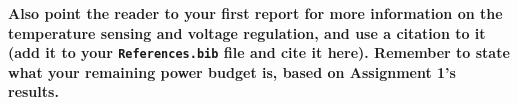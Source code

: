 \pagebreak


\textbf{Also point the reader to your first report for more information on the temperature sensing and voltage regulation, and use a citation to it (add it to your \texttt{References.bib} file and cite it here). Remember to state what your remaining power budget is, based on Assignment 1's results. 
}







